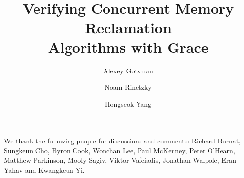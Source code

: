 \documentclass{llncs}
\title{Verifying Concurrent Memory Reclamation\\ Algorithms with Grace}
\author{Alexey Gotsman \and Noam Rinetzky \and Hongseok Yang}
\institute{IMDEA Software Institute \and Tel-Aviv University \and University of Oxford}
\newif\iflong
\begin{document}
\maketitle











{\small
{} We thank the following people for
discussions and comments: 
Richard Bornat,
Sungkeun Cho, 
Byron Cook,
Wonchan Lee, 
Paul McKenney, 
Peter O'Hearn, 
Matthew Parkinson, 
Mooly Sagiv,
Viktor Vafeiadis,
Jonathan Walpole,
Eran Yahav and
Kwangkeun Yi.
}




\iflong

\clearpage

\appendix









%
%
%
%

\fi
\end{document}
